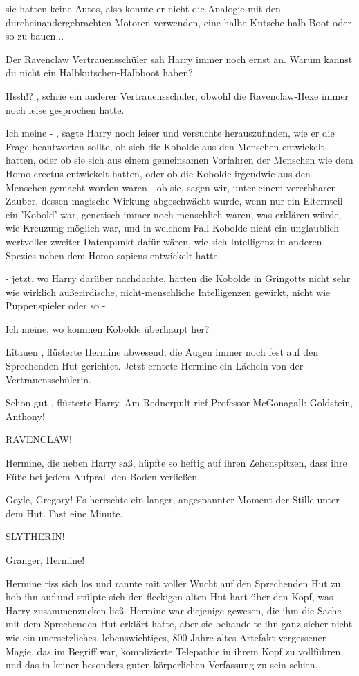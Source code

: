 sie hatten keine Autos, also konnte er nicht die Analogie mit den
durcheinandergebrachten Motoren verwenden, \glqq eine halbe Kutsche halb Boot
oder so zu bauen...\grqq{}

Der Ravenclaw Vertrauensschüler sah Harry immer noch ernst an. \glqq Warum
kannst du nicht ein Halbkutschen-Halbboot haben?\grqq{}

\glqq Hssh!?\grqq{} , schrie ein anderer Vertrauensschüler, obwohl die
Ravenclaw-Hexe immer noch leise gesprochen hatte.

\glqq Ich meine -\grqq{} , sagte Harry noch leiser und versuchte herauszufinden,
wie er die Frage beantworten sollte, ob sich die Kobolde aus den Menschen
entwickelt hatten, oder ob sie sich aus einem gemeinsamen Vorfahren der Menschen
wie dem Homo erectus entwickelt hatten, oder ob die Kobolde irgendwie aus den
Menschen gemacht worden waren - ob sie, sagen wir, unter einem vererbbaren
Zauber, dessen magische Wirkung abgeschwächt wurde, wenn nur ein Elternteil ein
'Kobold' war, genetisch immer noch menschlich waren, was erklären würde, wie
Kreuzung möglich war, und in welchem Fall Kobolde nicht ein unglaublich
wertvoller zweiter Datenpunkt dafür wären, wie sich Intelligenz in anderen
Spezies neben dem Homo sapiens entwickelt hatte

- jetzt, wo Harry darüber nachdachte, hatten die Kobolde in Gringotts nicht sehr
wie wirklich außerirdische, nicht-menschliche Intelligenzen gewirkt, nicht wie
Puppenspieler oder so -

\glqq Ich meine, wo kommen Kobolde überhaupt her? \glqq

\glqq Litauen\grqq{} , flüsterte Hermine abwesend, die Augen immer noch fest auf
den Sprechenden Hut gerichtet. Jetzt erntete Hermine ein Lächeln von der
Vertrauensschülerin.

\glqq Schon gut\grqq{} , flüsterte Harry. Am Rednerpult rief Professor
McGonagall: \glqq Goldstein, Anthony!\grqq{}

\glqq RAVENCLAW!\grqq{}

Hermine, die neben Harry saß, hüpfte so heftig auf ihren Zehenspitzen, dass ihre
Füße bei jedem Aufprall den Boden verließen.

\glqq Goyle, Gregory!\grqq{} Es herrschte ein langer, angespannter Moment der
Stille unter dem Hut. Fast eine Minute.

\glqq SLYTHERIN!\grqq{}

\glqq Granger, Hermine!\grqq{}

Hermine riss sich los und rannte mit voller Wucht auf den Sprechenden Hut zu,
hob ihn auf und stülpte sich den fleckigen alten Hut hart über den Kopf, was
Harry zusammenzucken ließ. Hermine war diejenige gewesen, die ihm die Sache mit
dem Sprechenden Hut erklärt hatte, aber sie behandelte ihn ganz sicher nicht wie
ein unersetzliches, lebenswichtiges, 800 Jahre altes Artefakt vergessener Magie,
das im Begriff war, komplizierte Telepathie in ihrem Kopf zu vollführen, und das
in keiner besonders guten körperlichen Verfassung zu sein schien.

